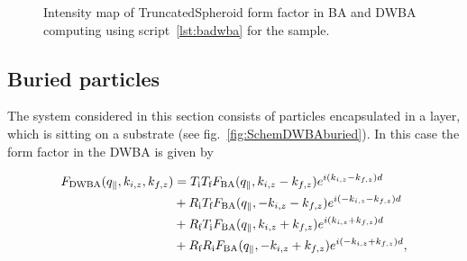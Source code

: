 \begin{figure}[tb]
\hfill
{}
\hfill
{}
\hfill
\caption{Intensity map of TruncatedSpheroid form factor in BA and DWBA computing using script~\ref{lst:badwba} for the sample.}
\label{fig:spheroidbadwba}
\end{figure}

\FloatBarrier


\subsection{Buried particles}

The system considered in this section consists of particles encapsulated in a layer, which is sitting on a substrate (see fig.~\ref{fig:SchemDWBAburied}). In this case the form factor in the DWBA is given by

\begin{align}
  F_{\rm{DWBA}}(q_{\parallel}, k_{i,z}, k_{f,z})
  &= T_\text{i} T_\text{f} F_{\rm{BA}}(q_{\parallel}, k_{i,z}-k_{f,z})e^{i(k_{i,z}-k_{f,z})d}\nonumber \\
  &+ R_\text{i} T_\text{f} F_{\rm{BA}}(q_{\parallel}, -k_{i,z}-k_{f,z})e^{i(-k_{i,z}-k_{f,z})d} \nonumber \\
  &+ R_\text{f} T_\text{i} F_{\rm{BA}}(q_{\parallel}, k_{i,z}+k_{f,z}) e^{i(k_{i,z}+k_{f,z})d}\nonumber \\
  &+ R_\text{f} R_\text{i}F_{\rm{BA}}(q_{\parallel},-k_{i,z}+k_{f,z})e^{i(-k_{i,z}+k_{f,z})d}, \label{Edwbaburied}
\end{align}

